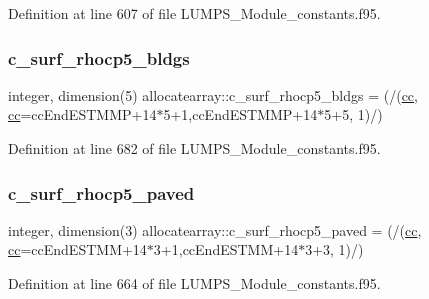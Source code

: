 Definition at line 607 of file L\+U\+M\+P\+S\+\_\+\+Module\+\_\+constants.\+f95.

\mbox{\label{namespaceallocatearray_a32c00f0a86e011490cbd416daad75789}} 
\subsubsection{\texorpdfstring{c\+\_\+surf\+\_\+rhocp5\+\_\+bldgs}{c\_surf\_rhocp5\_bldgs}}
{\footnotesize\ttfamily integer, dimension(5) allocatearray\+::c\+\_\+surf\+\_\+rhocp5\+\_\+bldgs = (/(\hyperlink{namespaceallocatearray_ac863c81704eb507dee10f5e10741e10c}{cc}, \hyperlink{namespaceallocatearray_ac863c81704eb507dee10f5e10741e10c}{cc}=cc\+End\+E\+S\+T\+M\+MP+14$\ast$5+1,cc\+End\+E\+S\+T\+M\+MP+14$\ast$5+5, 1)/)}



Definition at line 682 of file L\+U\+M\+P\+S\+\_\+\+Module\+\_\+constants.\+f95.

\mbox{\label{namespaceallocatearray_abfdcde71bd1c263d5cf829353a897407}} 
\subsubsection{\texorpdfstring{c\+\_\+surf\+\_\+rhocp5\+\_\+paved}{c\_surf\_rhocp5\_paved}}
{\footnotesize\ttfamily integer, dimension(3) allocatearray\+::c\+\_\+surf\+\_\+rhocp5\+\_\+paved = (/(\hyperlink{namespaceallocatearray_ac863c81704eb507dee10f5e10741e10c}{cc}, \hyperlink{namespaceallocatearray_ac863c81704eb507dee10f5e10741e10c}{cc}=cc\+End\+E\+S\+T\+MM+14$\ast$3+1,cc\+End\+E\+S\+T\+MM+14$\ast$3+3, 1)/)}



Definition at line 664 of file L\+U\+M\+P\+S\+\_\+\+Module\+\_\+constants.\+f95.

\mbox{\label{namespaceallocatearray_a866c8ff557fab63314fe0c293b2d1782}} 
